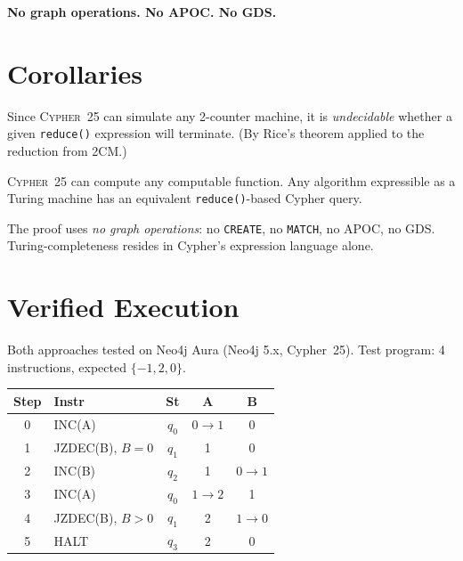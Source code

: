 \documentclass[sigconf, nonacm]{acmart}
\begin{document}
\smallskip
\noindent\textbf{No graph operations. No APOC. No GDS.}

\section{Corollaries}

\begin{factbox}
Since \textsc{Cypher~25} can simulate any 2-counter machine, it is
\emph{undecidable} whether a given \texttt{reduce()} expression
will terminate.
(By Rice's theorem applied to the reduction from 2CM.)
\end{factbox}

\begin{factbox}
\textsc{Cypher~25} can compute any computable function.
Any algorithm expressible as a Turing machine has an equivalent
\texttt{reduce()}-based Cypher query.
\end{factbox}

\begin{factbox}
The proof uses \emph{no graph operations}: no \texttt{CREATE}, no
\texttt{MATCH}, no APOC, no GDS. Turing-completeness resides in
Cypher's expression language alone.
\end{factbox}

\section{Verified Execution}

Both approaches tested on Neo4j Aura (Neo4j 5.x, Cypher~25). Test program:
4 instructions, expected $\{-1, 2, 0\}$.

{\small
\begin{tabular}{@{}clccc@{}}
\toprule
\textbf{Step} & \textbf{Instr} & \textbf{St} & \textbf{A} & \textbf{B} \\
\midrule
0 & INC(A) & $q_0$ & $0{\to}1$ & 0 \\
1 & JZDEC(B), $B{=}0$ & $q_1$ & 1 & 0 \\
2 & INC(B) & $q_2$ & 1 & $0{\to}1$ \\
3 & INC(A) & $q_0$ & $1{\to}2$ & 1 \\
4 & JZDEC(B), $B{>}0$ & $q_1$ & 2 & $1{\to}0$ \\
5 & HALT & $q_3$ & 2 & 0 \\
\bottomrule
\end{tabular}}
\end{document}
